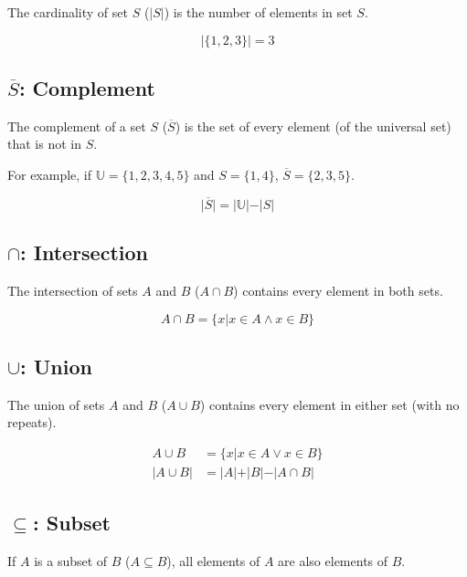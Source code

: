 \documentclass{report}
\begin{document}
The cardinality of set $S$ ($\vert S \vert$) is the number of elements in set $S$.

\begin{equation}
    \vert \{1, 2, 3\} \vert = 3
\end{equation}

\subsection{$\overline{S}$: Complement}

The complement of a set $S$ ($\overline{S}$) is the set of every element (of the universal set) that is not in $S$.

For example, if $\mathbb{U} = \{1, 2, 3, 4, 5\}$ and $S = \{1, 4\}$, $\overline{S} = \{2, 3, 5\}$.

\begin{equation}
    \vert \overline{S} \vert = \vert \mathbb{U} \vert - \vert S \vert
\end{equation}

\subsection{$\cap$: Intersection}

The intersection of sets $A$ and $B$ ($A \cap B$) contains every element in both sets.

\begin{equation}
    A \cap B = \{x \vert x \in A \land x \in B\} 
\end{equation}

\subsection{$\cup$: Union}

The union of sets $A$ and $B$ ($A \cup B$) contains every element in either set (with no repeats).

\begin{align}
    A \cup B &= \{x \vert x \in A \lor x \in B\} \\
    \vert A \cup B \vert &= \vert A \vert + \vert B \vert - \vert A \cap B \vert
\end{align}

\subsection{$\subseteq$: Subset}

If $A$ is a subset of $B$ ($A \subseteq B$), all elements of $A$ are also elements of $B$.
\end{document}
